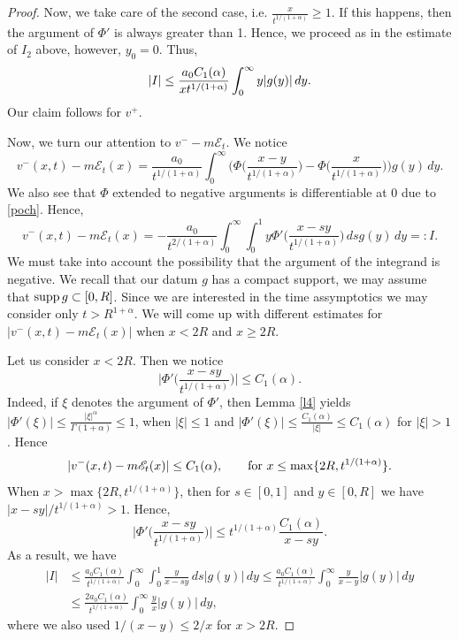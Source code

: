 \documentclass{article}
\def\sE{{\mathscr{E}}}
\def\supp{\hbox{supp}\, }
\begin{document}
\begin{proof}
Now, we take care of the second case, i.e. $\frac{x}{t^{1/(1+\alpha)}} \ge 1$. If this happens, then the argument of $\Phi'$ is always greater than 1. Hence, we proceed as in the estimate of $I_2$ above, however, $y_0=0$. Thus,
$$
|I| \le \frac{a_0 C_1(\alpha)}{%
xt^{1/(1+\alpha)}} \int_{0}^\infty y |g(y)|\, dy.
$$
Our claim follows for $v^+$.


Now, we turn our attention to $v^- -m\sE_t$. We notice
$$
v^-(x,t) - m\sE_t (x)= \frac{a_0}{t^{1/(1+\alpha)}}\int_0^\infty
\bigg(\Phi\bigg( \frac{x- y}{t^{1/(1+\alpha)}}\bigg)
-\Phi\bigg( \frac{x}{t^{1/(1+\alpha)}}\bigg)\bigg)g(y)\,dy.
$$
We also see that $\Phi$ extended to negative arguments is differentiable at $0$ due to \eqref{poch}. Hence,
$$
v^-(x,t) - m\sE_t(x) = -\frac{a_0}{t^{2/(1+\alpha)}}\int_0^\infty
\int_0^1 y \Phi'\bigg(\frac{x-sy}{t^{1/(1+\alpha)}}\bigg)\,ds g(y)\, dy=:I.
$$
We must take into account the possibility that  the argument of the integrand  is negative. We recall that our datum $g$ has a compact support, we may assume that $\supp g\subset[0,R]$. Since we are interested in the time assymptotics we may consider only $t> R^{1+\alpha}.$
We will come up with different estimates for $|v^-(x,t)-m \sE_t(x)|$ when $x<2R$ and $x\ge 2R$.

Let us consider $x<2R$. Then we notice
$$
\bigg| \Phi'\bigg(\frac{x-sy}{t^{1/(1+\alpha)}}\bigg)\bigg|\le C_1(\alpha).
$$
Indeed, if $\xi$ denotes the argument of $\Phi'$, then
Lemma \ref{l4} yields $|\Phi'(\xi)| \le \frac{|\xi|^\alpha}{\Gamma(1+\alpha)}\le 1$, when  $|\xi|\le 1$ and $|\Phi'(\xi)| \le \frac {C_1(\alpha)}{|\xi|}\le C_1(\alpha)$ for $|\xi|>1$. Hence
$$
|v^-(x,t)-  m \sE_t(x)|\le C_1(\alpha), \qquad\hbox{for }x\le \max\{2R, t^{1/(1+\alpha)}\}.
$$
When $x>\max\{2R, t^{1/(1+\alpha)}\}$, then for $s\in [0,1]$ and $y\in[0,R]$ we have
$|x-sy|/t^{1/(1+\alpha)}>1$. Hence,
$$
\bigg| \Phi'\bigg(\frac{x-sy}{t^{1/(1+\alpha)}}\bigg)\bigg|\le
t^{1/(1+\alpha)} \frac {C_1(\alpha)}{x-sy}.
$$
As a result, we have
\begin{align*}
|I| & \le  \frac{a_0 C_1(\alpha)}{t^{1/(1+\alpha)}}\int_0^\infty
\int_0^1  \frac y{x-sy}\,ds |g(y)|\, dy
\le    
\frac{a_0 C_1(\alpha)}{t^{1/(1+\alpha)}}\int_0^\infty \frac y{x-y} |g(y)|\,dy \\ &
\le  \frac{ 2a_0 C_1(\alpha)}{t^{1/(1+\alpha)}}\int_0^\infty \frac y{x} |g(y)|\,dy ,
\end{align*}
where we also used $1/(x-y) \le 2/x$ for $x> 2R.$
\end{proof}
\end{document}
